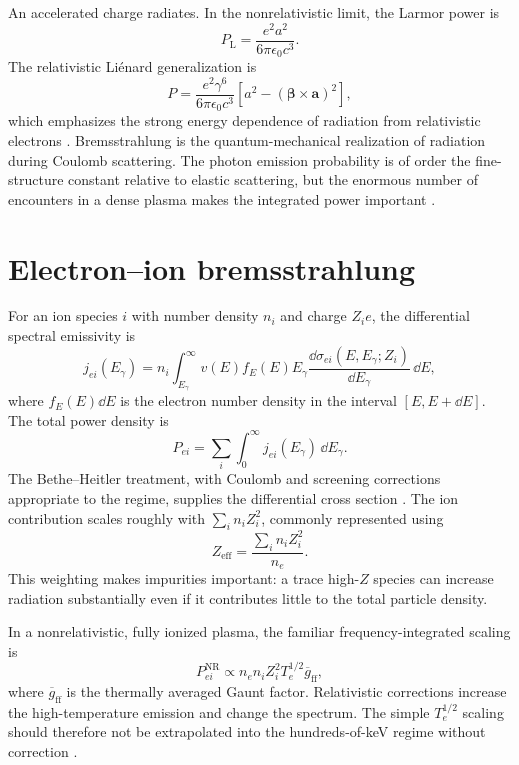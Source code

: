 An accelerated charge radiates. In the nonrelativistic limit, the Larmor power is
\begin{equation}
 P_{\mathrm{L}}=\frac{e^2a^2}{6\pi\epsilon_0c^3}.
\label{eq:larmor}
\end{equation}
The relativistic Liénard generalization is
\begin{equation}
P=\frac{e^2\gamma^6}{6\pi\epsilon_0c^3}
\left[a^2-(\boldsymbol{\beta}\times\mathbf{a})^2\right],
\label{eq:lienard}
\end{equation}
which emphasizes the strong energy dependence of radiation from relativistic electrons \cite{jackson1999}. Bremsstrahlung is the quantum-mechanical realization of radiation during Coulomb scattering. The photon emission probability is of order the fine-structure constant relative to elastic scattering, but the enormous number of encounters in a dense plasma makes the integrated power important \cite{jauch1976,akhiezer1965,bethe1954,koch1959}.

\section{Electron--ion bremsstrahlung}

For an ion species $i$ with number density $n_i$ and charge $Z_i e$, the differential spectral emissivity is
\begin{equation}
 j_{ei}(E_\gamma)
 =n_i\int_{E_\gamma}^{\infty}
 v(E)f_E(E)
 E_\gamma\frac{\dd\sigma_{ei}(E,E_\gamma;Z_i)}{\dd E_\gamma}
 \,\dd E,
\label{eq:ei-emissivity}
\end{equation}
where $f_E(E)\dd E$ is the electron number density in the interval $[E,E+\dd E]$. The total power density is
\begin{equation}
 P_{ei}=\sum_i\int_0^\infty j_{ei}(E_\gamma)\,\dd E_\gamma.
\label{eq:pei}
\end{equation}
The Bethe--Heitler treatment, with Coulomb and screening corrections appropriate to the regime, supplies the differential cross section \cite{bethe1954,davies1954,koch1959,haug2004}. The ion contribution scales roughly with $\sum_i n_iZ_i^2$, commonly represented using
\begin{equation}
 Z_{\mathrm{eff}}=\frac{\sum_i n_iZ_i^2}{n_e}.
\end{equation}
This weighting makes impurities important: a trace high-$Z$ species can increase radiation substantially even if it contributes little to the total particle density.

In a nonrelativistic, fully ionized plasma, the familiar frequency-integrated scaling is
\begin{equation}
P_{ei}^{\mathrm{NR}}\propto n_en_iZ_i^2T_e^{1/2}\overline{g}_{\mathrm{ff}},
\label{eq:ei-nr}
\end{equation}
where $\overline{g}_{\mathrm{ff}}$ is the thermally averaged Gaunt factor. Relativistic corrections increase the high-temperature emission and change the spectrum. The simple $T_e^{1/2}$ scaling should therefore not be extrapolated into the hundreds-of-keV regime without correction \cite{nozawa1998,svennson1982}.

